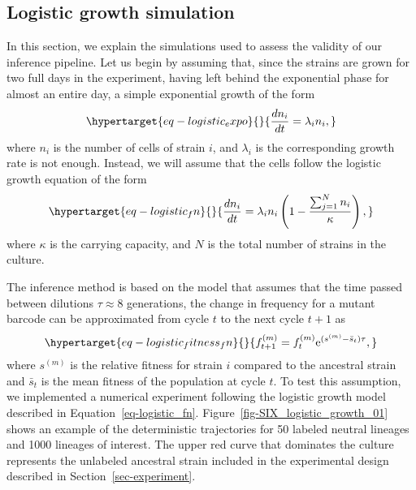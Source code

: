 \documentclass[
]{scrartcl}
\begin{document}
\begin{refsegment}
\hypertarget{sec-logistic}{%
\subsection{Logistic growth simulation}\label{sec-logistic}}

In this section, we explain the simulations used to assess the validity
of our inference pipeline. Let us begin by assuming that, since the
strains are grown for two full days in the experiment, having left
behind the exponential phase for almost an entire day, a simple
exponential growth of the form
\begin{equation}\protect\hypertarget{eq-logistic_expo}{}{
\frac{dn_i}{dt} = \lambda_i n_i,
}\label{eq-logistic_expo}\end{equation} where \(n_i\) is the number of
cells of strain \(i\), and \(\lambda_i\) is the corresponding growth
rate is not enough. Instead, we will assume that the cells follow the
logistic growth equation of the form
\begin{equation}\protect\hypertarget{eq-logistic_fn}{}{
\frac{dn_i}{dt} = \lambda_i n_i 
\left( 1 - \frac{\sum_{j=1}^{N}n_i}{\kappa}\right),
}\label{eq-logistic_fn}\end{equation} where \(\kappa\) is the carrying
capacity, and \(N\) is the total number of strains in the culture.

The inference method is based on the model that assumes that the time
passed between dilutions \(\tau \approx 8\) generations, the change in
frequency for a mutant barcode can be approximated from cycle \(t\) to
the next cycle \(t + 1\) as
\begin{equation}\protect\hypertarget{eq-logistic_fitness_fn}{}{
f_{t+1}^{(m)} = f_t^{(m)} \mathrm{e}^{(s^{(m)} - \bar{s}_t)\tau},
}\label{eq-logistic_fitness_fn}\end{equation} where \(s^{(m)}\) is the
relative fitness for strain \(i\) compared to the ancestral strain and
\(\bar{s}_t\) is the mean fitness of the population at cycle \(t\). To
test this assumption, we implemented a numerical experiment following
the logistic growth model described in Equation~\ref{eq-logistic_fn}.
Figure~\ref{fig-SIX_logistic_growth_01} shows an example of the
deterministic trajectories for 50 labeled neutral lineages and 1000
lineages of interest. The upper red curve that dominates the culture
represents the unlabeled ancestral strain included in the experimental
design described in Section~\ref{sec-experiment}.

\begin{figure}


\end{figure}
\end{refsegment}
\end{document}
